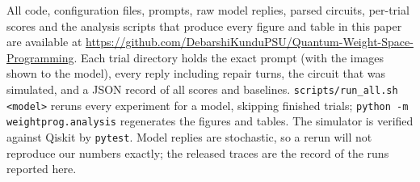 All code, configuration files, prompts, raw model replies, parsed circuits, per-trial scores and the analysis scripts that produce every figure and table in this paper are available at \url{https://github.com/DebarshiKunduPSU/Quantum-Weight-Space-Programming}. Each trial directory holds the exact prompt (with the images shown to the model), every reply including repair turns, the circuit that was simulated, and a JSON record of all scores and baselines. \texttt{scripts/run\_all.sh <model>} reruns every experiment for a model, skipping finished trials; \texttt{python -m weightprog.analysis} regenerates the figures and tables. The simulator is verified against Qiskit by \texttt{pytest}. Model replies are stochastic, so a rerun will not reproduce our numbers exactly; the released traces are the record of the runs reported here.
